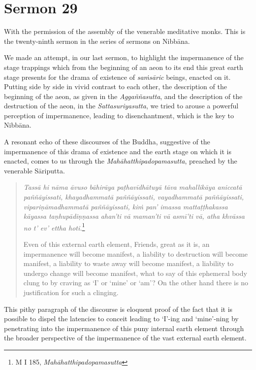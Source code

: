 \chapter{Sermon 29}

\NibbanaOpeningQuote

With the permission of the assembly of the venerable meditative monks. This is the twenty-ninth sermon in the series of sermons on Nibbāna.

We made an attempt, in our last sermon, to highlight the impermanence of the stage trappings which from the beginning of an aeon to its end this great earth stage presents for the drama of existence of \emph{saṁsāric} beings, enacted on it. Putting side by side in vivid contrast to each other, the description of the beginning of the aeon, as given in the \emph{Aggaññasutta}, and the description of the destruction of the aeon, in the \emph{Sattasuriyasutta}, we tried to arouse a powerful perception of impermanence, leading to disenchantment, which is the key to Nibbāna.

A resonant echo of these discourses of the Buddha, suggestive of the impermanence of this drama of existence and the earth stage on which it is enacted, comes to us through the \emph{Mahāhatthipadopamasutta}, preached by the venerable Sāriputta.

\begin{quote}
\emph{Tassā hi nāma āvuso bāhirāya paṭhavīdhātuyā tāva mahallikāya aniccatā paññāyissati, khayadhammatā paññāyissati, vayadhammatā paññāyissati, vipariṇāmadhammatā paññāyissati, kiṁ pan' imassa mattaṭṭhakassa kāyassa taṇhupādiṇṇassa ahan'ti vā maman'ti vā asmī'ti vā, atha khvāssa no t' ev' ettha hoti.}\footnote{M I 185, \emph{Mahāhatthipadopamasutta}}

Even of this external earth element, Friends, great as it is, an impermanence will become manifest, a liability to destruction will become manifest, a liability to waste away will become manifest, a liability to undergo change will become manifest, what to say of this ephemeral body clung to by craving as `I' or `mine' or `am'? On the other hand there is no justification for such a clinging.
\end{quote}

This pithy paragraph of the discourse is eloquent proof of the fact that it is possible to dispel the latencies to conceit leading to `I'-ing and `mine'-ning by penetrating into the impermanence of this puny internal earth element through the broader perspective of the impermanence of the vast external earth element.

